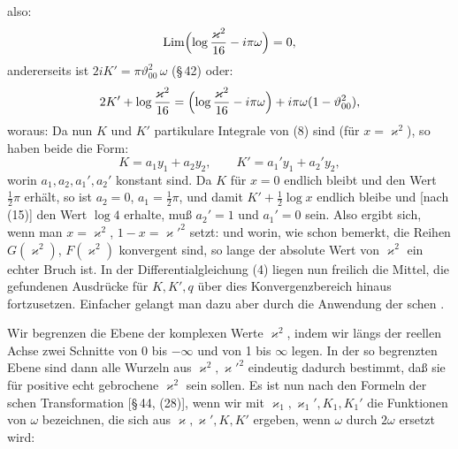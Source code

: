 
also:
\[
\mathrm{Lim}\Bigl(\log\frac{\varkappa^2}{16} - i\pi\omega\Bigr) = 0,
\]
andererseits ist $2iK' = \pi\vartheta_{00}^2\,\omega$ (\S\,42) oder:
\[
2K' + \log\frac{\varkappa^2}{16} = \Bigl(\log\frac{\varkappa^2}{16} - i\pi\omega\Bigr) + i\pi\omega(1-\vartheta_{00}^2),
\]
woraus:
Da nun $K$ und $K'$ partikulare Integrale von (8) sind (für
$x=\varkappa^2$), so haben beide die Form:
\[
K = a_1 y_1 + a_2 y_2, \qquad K' = a_1' y_1 + a_2' y_2,
\]
worin $a_1, a_2, a_1', a_2'$ konstant sind. Da $K$ für $x=0$ endlich
bleibt und den Wert $\frac12\pi$ erhält, so ist $a_2=0$, $a_1=\frac12\pi$, und
damit $K'+\frac12\log x$ endlich bleibe und [nach (15)] den Wert $\log 4$
erhalte, muß $a_2'=1$ und $a_1'=0$ sein. Also ergibt sich, wenn
man $x=\varkappa^2$, $1-x=\varkappa'^2$ setzt:
und
worin, wie schon bemerkt, die Reihen $G(\varkappa^2)$, $F(\varkappa^2)$ konvergent
sind, so lange der absolute Wert von $\varkappa^2$ ein echter Bruch ist.
In
der Differentialgleichung (4) liegen nun freilich die Mittel, die
gefundenen Ausdrücke für $K,K',q$ über dies Konvergenzbereich %
hinaus fortzusetzen. Einfacher gelangt man dazu aber durch die
Anwendung der schen .

Wir begrenzen die Ebene der komplexen Werte $\varkappa^2$, indem
wir längs der reellen Achse zwei Schnitte von 0 bis $-\infty$ und
von 1 bis $\infty$ legen. In der so begrenzten Ebene sind dann alle
Wurzeln aus $\varkappa^2, \varkappa'^2$ eindeutig dadurch bestimmt, daß sie für
positive echt gebrochene $\varkappa^2$  sein sollen. Es
ist nun nach den Formeln der schen Transformation
[\S\,44, (28)], wenn wir mit $\varkappa_1,\varkappa_1',K_1,K_1'$ die Funktionen von $\omega$
bezeichnen, die sich aus $\varkappa,\varkappa',K,K'$ ergeben, wenn $\omega$ durch $2\omega$
ersetzt wird:
